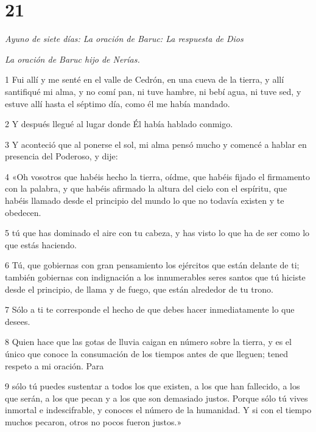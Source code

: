 \chapter{21}

\par \textit{Ayuno de siete días: La oración de Baruc: La respuesta de Dios}

\par \textit{La oración de Baruc hijo de Nerías.}

\par 1 Fui allí y me senté en el valle de Cedrón, en una cueva de la tierra, y allí santifiqué mi alma, y ​​no comí pan, ni tuve hambre, ni bebí agua, ni tuve sed, y estuve allí hasta el séptimo día, como él me había mandado.

\par 2 Y después llegué al lugar donde Él había hablado conmigo.

\par 3 Y aconteció que al ponerse el sol, mi alma pensó mucho y comencé a hablar en presencia del Poderoso, y dije:

\par 4 «Oh vosotros que habéis hecho la tierra, oídme, que habéis fijado el firmamento con la palabra, y que habéis afirmado la altura del cielo con el espíritu, que habéis llamado desde el principio del mundo lo que no todavía existen y te obedecen.

\par 5 tú que has dominado el aire con tu cabeza, y has visto lo que ha de ser como lo que estás haciendo.

\par 6 Tú, que gobiernas con gran pensamiento los ejércitos que están delante de ti; también gobiernas con indignación a los innumerables seres santos que tú hiciste desde el principio, de llama y de fuego, que están alrededor de tu trono.

\par 7 Sólo a ti te corresponde el hecho de que debes hacer inmediatamente lo que desees.

\par 8 Quien hace que las gotas de lluvia caigan en número sobre la tierra, y es el único que conoce la consumación de los tiempos antes de que lleguen; tened respeto a mi oración. Para

\par 9 sólo tú puedes sustentar a todos los que existen, a los que han fallecido, a los que serán, a los que pecan y a los que son demasiado justos. Porque sólo tú vives inmortal e indescifrable, y conoces el número de la humanidad. Y si con el tiempo muchos pecaron, otros no pocos fueron justos.»

